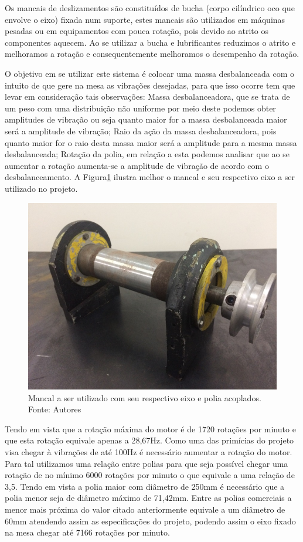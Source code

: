     Os mancais de deslizamentos são constituídos de bucha (corpo cilíndrico oco que envolve o eixo) fixada num suporte, estes mancais são utilizados em máquinas pesadas ou em equipamentos com pouca rotação, pois devido ao atrito os componentes aquecem. Ao se utilizar a bucha e lubrificantes reduzimos o atrito e melhoramos a rotação e consequentemente melhoramos o desempenho da rotação.

    O objetivo em se utilizar este sistema é colocar uma massa desbalanceada com o intuito de que gere na mesa as vibrações desejadas, para que isso ocorre tem que levar em consideração tais observações: Massa desbalanceadora, que se trata de um peso com uma distribuição não uniforme por meio deste podemos obter amplitudes de vibração ou seja quanto maior for a massa desbalanceada maior será a amplitude de vibração; Raio da ação da massa desbalanceadora, pois quanto maior for o raio desta massa maior será a amplitude para a mesma massa desbalanceada; Rotação da polia, em relação a esta podemos analisar que ao se aumentar a rotação aumenta-se a amplitude de vibração de acordo com o desbalanceamento. A Figura\ref{fig:mancal} ilustra melhor o mancal e seu respectivo eixo a ser utilizado no projeto.

\begin{figure}[H]
\centering
\includegraphics[scale=0.9]{figuras/mancal.jpg}
\caption{Mancal a ser utilizado com seu respectivo eixo e polia acoplados. Fonte: Autores}
\label{fig:mancal}
\end{figure}


    Tendo em vista que a rotação máxima do motor é de 1720 rotações por minuto e que esta rotação equivale apenas a 28,67Hz. Como uma das primícias do projeto visa chegar à vibrações de até 100Hz é necessário aumentar a rotação do motor. Para tal utilizamos uma relação entre polias para que seja possível chegar uma rotação de no mínimo 6000 rotações por minuto o que equivale a uma relação de 3,5. Tendo em vista a polia maior com diâmetro de 250mm é necessário que a polia menor seja de diâmetro máximo de 71,42mm. Entre as polias comerciais a menor mais próxima do valor citado anteriormente equivale a um diâmetro de 60mm atendendo assim as especificações do projeto, podendo assim o eixo fixado na mesa chegar até 7166 rotações por minuto.
